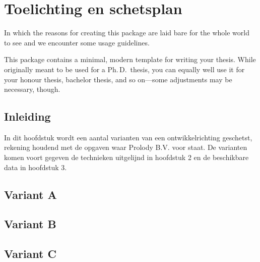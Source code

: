 \chapter{Toelichting en schetsplan}

\begin{center}
  \begin{minipage}{0.5\textwidth}
    \begin{small}
      In which the reasons for creating this package are laid bare for the
      whole world to see and we encounter some usage guidelines.
    \end{small}
  \end{minipage}
  \vspace{0.5cm}
\end{center}

\noindent This package contains a minimal, modern template for writing your
thesis. While originally meant to be used for a Ph.\,D.\ thesis, you can
equally well use it for your honour thesis, bachelor thesis, and so
on---some adjustments may be necessary, though.

\section{Inleiding}
In dit hoofdstuk wordt een aantal varianten van een ontwikkelrichting geschetst, rekening houdend met de opgaven waar Prolody B.V. voor staat. De varianten komen voort gegeven de technieken uitgelijnd in hoofdstuk 2 en de beschikbare data in hoofdstuk 3.

\section{Variant A}


\section{Variant B}

\section{Variant C}

